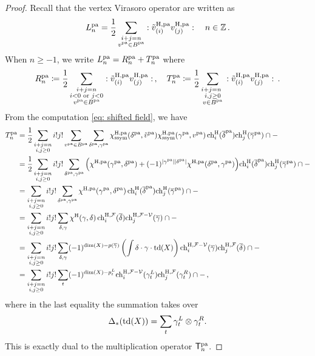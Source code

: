 \documentclass[a4paper, 12pt]{amsart}
\begin{document}
\begin{proof}
Recall that the vertex Virasoro operator are written as 
$$L_n^{\pa}=\frac{1}{2}\sum_{\substack{ i+j=n \\ v^{\pa}\in B^{\pa}}}:\tilde{v}^{\HH,\pa}_{(i)} v^{\HH,\pa}_{(j)}:\quad n\in\BZ\,.
$$
When $n\geq -1$, we write $L_n^{\pa}=R_n^{\pa}+T_n^{\pa}$ where 
$$R_n^{\pa}\coloneqq \frac{1}{2}\sum_{\substack{ i+j=n\\ i<0\textnormal{ or }j<0 \\ v^{\pa}\in B^{\pa}}}:\tilde{v}^{\HH,\pa}_{(i)} v^{\HH,\pa}_{(j)}:\,,\quad
T_n^{\pa}\coloneqq \frac{1}{2}\sum_{\substack{ i+j=n\ \\i,j\geq 0 \\ v\in B^{\pa}}}:\tilde{v}^{\HH,\pa}_{(i)} v^{\HH,\pa}_{(j)}:\,.
$$
From the computation \eqref{eq: shifted field}, we have
\begin{align*}
    T_n^{\pa}
    &=\frac{1}{2}\sum_{\substack{i+j=n\\i,j\geq 0}}i!j!\sum_{v^{\pa}\in B^{\pa}}\sum_{\delta^{\pa}, \gamma^{\pa}}
    \chi^{\HH,\pa}_{\ssym}(\delta^{\pa},\tilde{v}^{\pa})
    \chi^{\HH,\pa}_{\ssym}(\gamma^{\pa},v^{\pa})\,
    \ch_i^\HH(\overline{\delta}^{\pa})\ch_j^\HH(\overline{\gamma}^{\pa})\cap -\\
    &=\frac{1}{2}\sum_{\substack{i+j=n\\i,j\geq 0}}i!j!
    \sum_{\delta^{\pa}, \gamma^{\pa}}
    \Big(\chi^{\HH,\pa}(\gamma^{\pa},\delta^{\pa})+(-1)^{|\gamma^{\pa}||\delta^{\pa}|}\chi^{\HH,\pa}(\delta^{\pa},\gamma^{\pa})\Big)
    \ch_i^\HH(\overline{\delta}^{\pa})\ch_j^\HH(\overline{\gamma}^{\pa})\cap -\\
    &=\sum_{\substack{i+j=n\\i,j\geq 0}}i!j!
    \sum_{\delta^{\pa}, \gamma^{\pa}}
    \chi^{\HH,\pa}(\gamma^{\pa},\delta^{\pa})\,
    \ch_i^\HH(\overline{\delta}^{\pa})\ch_j^\HH(\overline{\gamma}^{\pa})\cap -\\
    &=\sum_{\substack{i+j=n\\i,j\geq 0}}i!j!
   \sum_{\delta,\gamma}
    \chi^{\HH}(\gamma,\delta)\,
    \ch_i^{\HH,\CF}(\overline{\delta})\ch_j^{\HH,\CF-\CV}(\overline{\gamma})\cap -\\
    &=\sum_{\substack{i+j=n\\i,j\geq 0}}i!j!
   \sum_{\delta,\gamma}
   (-1)^{\dim(X)-p(\overline{\gamma})}
    \left(\int \delta \cdot \gamma\cdot \td(X)\right) \ch_i^{\HH,\CF-\CV}(\overline{\gamma})\ch_j^{\HH,\CF}(\overline{\delta})\cap -\\
    &=\sum_{\substack{i+j=n\\i,j\geq 0}}i!j!\sum_t (-1)^{\dim(X)-p_t^L}\ch_i^{\HH,\CF-\CV}(\gamma_t^L)\ch_j^{\HH,\CF}(\gamma_t^R)\cap -\,,
\end{align*}
where in the last equality the summation takes over
$$\Delta_*(\td(X))=\sum_t \gamma_t^L\otimes \gamma_t^R.
$$
This is exactly dual to the multiplication operator $\bT_n^{\pa}$. 


\end{proof}
\end{document}
